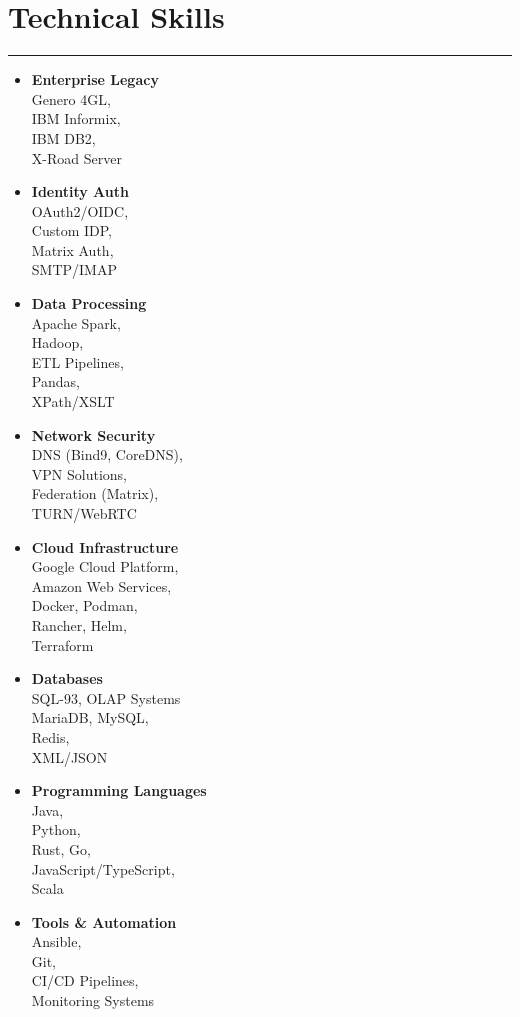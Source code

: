 \documentclass[a4paper,10pt]{article}
\newcommand{\cvheading}[1]{%
  {\headingfont\section*{#1}}
  \vspace{-0.2cm}
  \hrule
  \vspace{0.2cm}
}
\begin{document}
\cvheading{Technical Skills}
\begin{multicols}{3}
\begin{itemize}[nosep, leftmargin=*]
\item \textbf{Enterprise Legacy}\\
  Genero 4GL,\\
  IBM Informix,\\
  IBM DB2,\\
  X-Road Server

\item \textbf{Identity Auth}\\
  OAuth2/OIDC,\\
  Custom IDP,\\
  Matrix Auth,\\
  SMTP/IMAP

\item \textbf{Data Processing}\\
  Apache Spark,\\
  Hadoop,\\
  ETL Pipelines,\\
  Pandas,\\
  XPath/XSLT

\columnbreak

\item \textbf{Network Security}\\
  DNS (Bind9, CoreDNS),\\
  VPN Solutions,\\
  Federation (Matrix),\\
  TURN/WebRTC

\item \textbf{Cloud Infrastructure}\\
  Google Cloud Platform,\\
  Amazon Web Services,\\
  Docker, Podman,\\
  Rancher, Helm,\\
  Terraform

\item \textbf{Databases}\\
  SQL-93, OLAP Systems\\
  MariaDB, MySQL,\\
  Redis,\\
  XML/JSON

\columnbreak

\item \textbf{Programming Languages}\\
  Java,\\
  Python,\\
  Rust, Go,\\
  JavaScript/TypeScript,\\
  Scala

\item \textbf{Tools \& Automation}\\
  Ansible,\\
  Git,\\
  CI/CD Pipelines,\\
  Monitoring Systems

\end{itemize}
\end{multicols}
\end{document}
